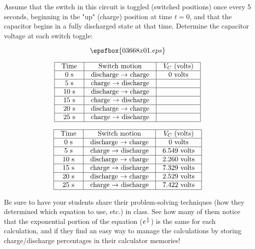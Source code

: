 

Assume that the switch in this circuit is toggled (switched positions) once every 5 seconds, beginning in the "up" (charge) position at time $t = 0$, and that the capacitor begins in a fully discharged state at that time.  Determine the capacitor voltage at each switch toggle:

$$\epsfbox{03668x01.eps}$$


$$\vbox{\offinterlineskip
\halign{\strut
\vrule \quad\hfil # \ \hfil & 
\vrule \quad\hfil # \ \hfil & 
\vrule \quad\hfil # \ \hfil \vrule \cr
\noalign{\hrule}
%
Time & Switch motion & $V_C$ (volts) \cr
%
\noalign{\hrule}
%
0 s & discharge $\to$ charge & 0 volts \cr
%
\noalign{\hrule}
%
5 s & charge $\to$ discharge &  \cr
%
\noalign{\hrule}
%
10 s & discharge $\to$ charge &  \cr
%
\noalign{\hrule}
%
15 s & charge $\to$ discharge &  \cr
%
\noalign{\hrule}
%
20 s & discharge $\to$ charge &  \cr
%
\noalign{\hrule}
%
25 s & charge $\to$ discharge &  \cr
%
\noalign{\hrule}
} %
}$$ %








$$\vbox{\offinterlineskip
\halign{\strut
\vrule \quad\hfil # \ \hfil & 
\vrule \quad\hfil # \ \hfil & 
\vrule \quad\hfil # \ \hfil \vrule \cr
\noalign{\hrule}
%
Time & Switch motion & $V_C$ (volts) \cr
%
\noalign{\hrule}
%
0 s & discharge $\to$ charge & 0 volts \cr
%
\noalign{\hrule}
%
5 s & charge $\to$ discharge & 6.549 volts \cr
%
\noalign{\hrule}
%
10 s & discharge $\to$ charge & 2.260 volts \cr
%
\noalign{\hrule}
%
15 s & charge $\to$ discharge & 7.329 volts \cr
%
\noalign{\hrule}
%
20 s & discharge $\to$ charge & 2.529 volts \cr
%
\noalign{\hrule}
%
25 s & charge $\to$ discharge & 7.422 volts \cr
%
\noalign{\hrule}
} %
}$$ %







Be sure to have your students share their problem-solving techniques (how they determined which equation to use, etc.) in class.  See how many of them notice that the exponential portion of the equation ($e^{t \over \tau}$) is the same for each calculation, and if they find an easy way to manage the calculations by storing charge/discharge percentages in their calculator memories!




